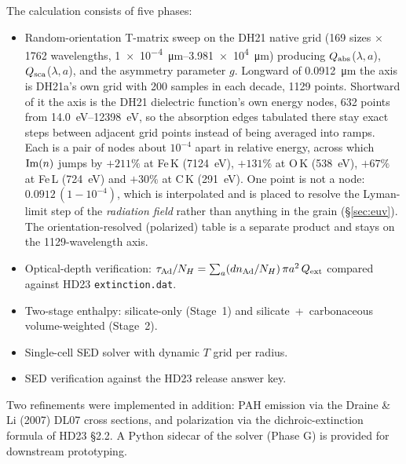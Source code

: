 \documentclass{my_memo}
\newcommand{\Qabs}{\ensuremath{Q_{\rm abs}}}
\newcommand{\Qext}{\ensuremath{Q_{\rm ext}}}
\newcommand{\Qsca}{\ensuremath{Q_{\rm sca}}}
\begin{document}
The calculation consists of five phases:
\begin{itemize}
  \item[A.] Random-orientation T-matrix sweep on the DH21 native grid
        (169 sizes $\times$ 1762 wavelengths,
        \SIrange{1e-4}{3.981e4}{\micro\meter}) producing
        \Qabs($\lambda, a$), \Qsca($\lambda, a$), and the asymmetry
        parameter $g$. Longward of \SI{0.0912}{\micro\meter} the axis is
        DH21a's own grid with 200 samples in each decade, 1129 points. Shortward of it
        the axis is the DH21 dielectric function's own energy nodes,
        632 points from \SIrange{14.0}{12398}{\electronvolt}, so the
        absorption edges tabulated there stay exact steps between
        adjacent grid points instead of being averaged into ramps. Each
        is a pair of nodes about $10^{-4}$ apart in relative energy,
        across which ${\rm Im}(n)$ jumps by $+211\%$ at Fe\,K
        (\SI{7124}{\electronvolt}), $+131\%$ at O\,K
        (\SI{538}{\electronvolt}), $+67\%$ at Fe\,L
        (\SI{724}{\electronvolt}) and $+30\%$ at C\,K
        (\SI{291}{\electronvolt}). One point is not a node: $0.0912\,(1-10^{-4})$, which is
        interpolated and is placed to resolve the Lyman-limit step of
        the \emph{radiation field} rather than anything in the grain
        (\S\ref{sec:euv}). The orientation-resolved (polarized) table
        is a separate product and stays on the 1129-wavelength axis.
  \item[B.] Optical-depth verification:
        $\tau_{\rm Ad}/N_H = \sum_a (dn_{\rm Ad}/N_H)\,\pi a^2\,\Qext$
        compared against HD23 \texttt{extinction.dat}.
  \item[C.] Two-stage enthalpy: silicate-only (Stage~1) and
        silicate~+~carbonaceous volume-weighted (Stage~2).
  \item[D.] Single-cell SED solver with dynamic $T$ grid per radius.
  \item[E.] SED verification against the HD23 release answer key.
\end{itemize}
Two refinements were implemented in addition: PAH emission via the
Draine \& Li (2007) DL07 cross sections, and polarization
via the dichroic-extinction formula of HD23 \S2.2. A
Python sidecar of the solver (Phase G) is provided for downstream
prototyping.
\end{document}
